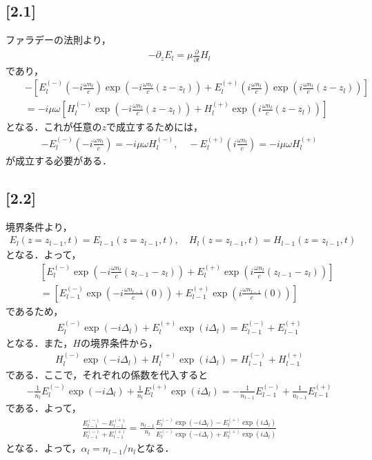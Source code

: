 \documentclass[12pt,dvipdfmx]{jsarticle}
\begin{document}
\subsection*{\large{[2.1]}}
ファラデーの法則より，
\begin{eqnarray}
  -\partial_z E_l=  \mu \frac{\partial }{\partial t} H_l
\end{eqnarray}
であり，
\begin{eqnarray}
  &&- \left[ E_l^{(-)}\left( -i\frac{\omega n_l}{c} \right)\exp\left( -i\frac{\omega n_l}{c}(z-z_l) \right) + E_l^{(+)}\left( i\frac{\omega n_l}{c} \right)\exp\left( i\frac{\omega n_l}{c}(z-z_l) \right) \right] \\
  &&=-i\mu\omega \left[ H_l^{(-)}\exp\left( -i\frac{\omega n_l}{c}(z-z_l) \right)  + H_l^{(+)}\exp\left(i\frac{\omega n_l}{c}(z-z_l) \right)  \right]
\end{eqnarray}
となる．これが任意の$z$で成立するためには，
\begin{eqnarray}
  -E_l^{(-)}\left( -i\frac{\omega n_l}{c} \right) = -i\mu\omega H_l^{(-)}, \quad  -E_l^{(+)}\left( i\frac{\omega n_l}{c} \right) = -i\mu\omega H_l^{(+)}
\end{eqnarray}
が成立する必要がある．
\subsection*{\large{[2.2]}}
境界条件より，
\begin{eqnarray}
  E_l(z=z_{l-1},t) = E_{l-1}(z=z_{l-1},t), \quad H_l(z=z_{l-1},t) = H_{l-1}(z=z_{l-1},t)
\end{eqnarray}
となる．よって，
\begin{eqnarray}
  &&\left[ E_l^{(-)}\exp\left( -i\frac{\omega n_l}{c}(z_{l-1}-z_{l}) \right) + E_l^{(+)}\exp\left( i\frac{\omega n_l}{c}(z_{l-1}-z_{l}) \right) \right]\\
  && = \left[ E_{l-1}^{(-)}\exp\left( -i\frac{\omega n_{l-1}}{c}(0) \right) + E_{l-1}^{(+)}\exp\left( i\frac{\omega n_{l-1}}{c}(0) \right) \right]
\end{eqnarray}
であるため，
\begin{eqnarray}
  E_l^{(-)}\exp\left( -i\Delta_l \right) + E_l^{(+)}\exp\left( i\Delta_l \right) = E_{l-1}^{(-)} +  E_{l-1}^{(+)}
\end{eqnarray}
となる．また，$H$の境界条件から，
\begin{eqnarray}
  H_l^{(-)}\exp\left( -i\Delta_l \right) + H_l^{(+)}\exp\left( i\Delta_l \right) = H_{l-1}^{(-)} +  H_{l-1}^{(+)}
\end{eqnarray}
である．ここで，それぞれの係数を代入すると
\begin{eqnarray}
  -\frac{1}{n_l}E_l^{(-)}\exp\left( -i\Delta_l \right) +\frac{1}{n_l} E_l^{(+)}\exp\left( i\Delta_l \right) = -\frac{1}{n_{l-1}}E_{l-1}^{(-)} +\frac{1}{n_{l-1}}  E_{l-1}^{(+)}
\end{eqnarray}
である．よって，
\begin{eqnarray}
  \frac{E_{l-1}^{(-)}-E_{l-1}^{(+)}}{E_{l-1}^{(-)}+E_{l-1}^{(+)}} = \frac{n_{l-1}}{n_l}\frac{E_l^{(-)}\exp\left( -i\Delta_l \right)-E_l^{(+)}\exp\left( i\Delta_l \right)}{E_l^{(-)}\exp\left( -i\Delta_l \right)+E_l^{(+)}\exp\left( i\Delta_l \right)}
\end{eqnarray}
となる．よって，$\alpha_l = n_{l-1}/n_l$となる．
\end{document}
